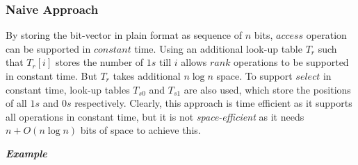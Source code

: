 \subsubsection{Naive Approach}
By storing the bit-vector in plain format as sequence of $n$ bits, $access$ operation can be supported in $constant$ time. Using an additional look-up table $T_r$ such that $T_r[i]$ stores the number of $1s$ till $i$ allows $rank$ operations to be supported in constant time. But $T_r$ takes additional $n\log n$ space. To support $select$ in constant time, look-up tables $T_{s0}$ and $T_{s1}$ are also used, which store the positions of all $1s$ and $0s$ respectively. Clearly, this approach is time efficient as it supports all operations in constant time, but it is not \textit{space-efficient} as it needs $n + O(n\log n)$ bits of space to achieve this.\par
\textit{\textbf{Example}}

